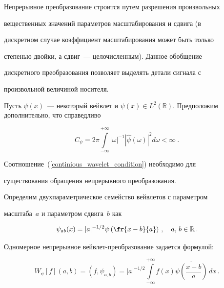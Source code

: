 Непрерывное преобразование строится путем разрешения произвольных

вещественных значений параметров масштабирования и сдвига (в

дискретном случае коэффициент масштабирования может быть только

степенью двойки, а сдвиг~--- целочисленным). Данное обобщение

дискретного преобразования позволяет выделять детали сигнала с

произвольной величиной носителя.



Пусть $\psi(x)$~--- некоторый вейвлет и $\psi(x)\in

L^{2}(\mathbb{R})$. Предположим дополнительно, что справедливо

\begin{equation}

    \label{continious_wavelet_condition}

    C_{\psi}=2\pi\int\limits_{-\infty}^{+\infty}{|\omega|^{-1}|\hat{\psi}(\omega)|^{2}d\omega}<\infty ~.

\end{equation}

Соотношение~(\ref{continious_wavelet_condition}) необходимо для

существования обращения непрерывного преобразования.



Определим двухпараметрическое семейство вейвлетов с параметром

масштаба~$a$ и параметром сдвига~$b$ как

\begin{equation*}


    \psi_{ab}(x)=|a|^{-1/2}\psi\left(\fr{x-b}{a}\right)\,, \quad a,\,b\in\mathbb{R}\,.

\end{equation*}



Одномерное непрерывное вейвлет-преобразование задается формулой:

\begin{equation}

    \label{continious_wavelet_transform}

     W_{\psi}\left[f\right](a,b)=

     \left(f,\psi_{a,b}\right)=|a|^{-1/2}

     \int\limits_{-\infty}^{+\infty}{f(x)\overline{\psi\left(\frac{x-b}{a}\right)}\,dx}\,.

\end{equation}



